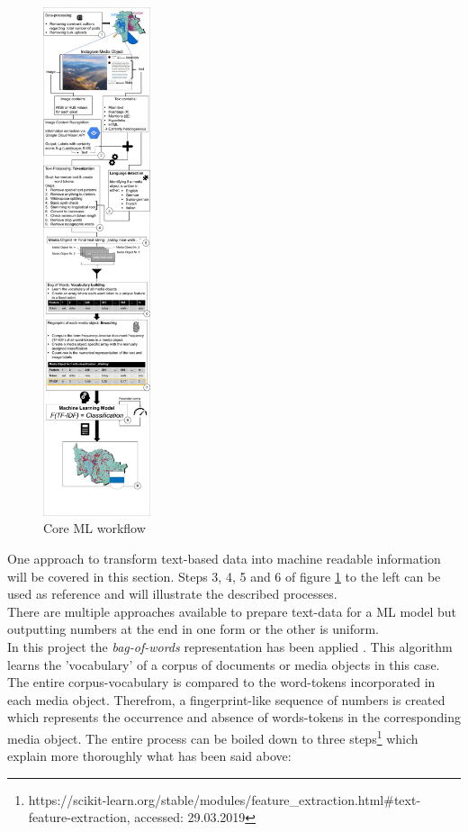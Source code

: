 \begin{figure} %
    \centerline{\includegraphics[trim={0 0 0 0},clip,width=0.28\textwidth]{img/ML_text_data_visualization_cropped.pdf}}
  \caption{Core ML workflow}
  \label{fig:ml_visualisation}
\end{figure}
One approach to transform text-based data into machine readable information will be covered in this section. Steps 3, 4, 5 and 6 of figure \ref{fig:ml_visualisation} to the left can be used as reference and will illustrate the described processes.\\
There are multiple approaches available to prepare text-data for a ML model but outputting numbers at the end in one form or the other is uniform.\\
In this project the \textit{bag-of-words} representation has been applied \parencite{Joulin2016}. This algorithm learns the 'vocabulary' of a corpus of documents or media objects in this case. The entire corpus-vocabulary is compared to the word-tokens incorporated in each media object. Therefrom, a fingerprint-like sequence of numbers is created which represents the occurrence and absence of words-tokens in the corresponding media object. The entire process can be boiled down to three steps\footnote{https://scikit-learn.org/stable/modules/feature\_extraction.html\#text-feature-extraction, accessed: 29.03.2019} which explain more thoroughly what has been said above:

